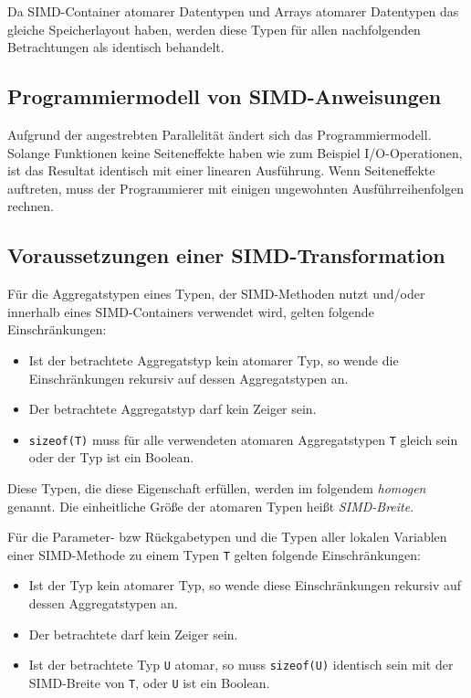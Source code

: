 \documentclass[a4paper,10pt]{article}
\begin{document}
Da SIMD-Container atomarer Datentypen und Arrays atomarer Datentypen das gleiche Speicherlayout
haben, werden diese Typen für allen nachfolgenden Betrachtungen als identisch behandelt.

\subsection{Programmiermodell von SIMD-Anweisungen}

Aufgrund der angestrebten Parallelität ändert sich das Programmiermodell. Solange Funktionen
keine Seiteneffekte haben wie zum Beispiel I/O-Operationen, ist das Resultat identisch mit
einer linearen Ausführung. Wenn Seiteneffekte auftreten, muss der Programmierer mit einigen
ungewohnten Ausführreihenfolgen rechnen. 

\subsection{Voraussetzungen einer SIMD-Transformation}

Für die Aggregatstypen eines Typen, der SIMD-Methoden nutzt und/oder innerhalb eines
SIMD-Containers verwendet wird, gelten folgende Einschränkungen:

\begin{itemize}

    \item Ist der betrachtete Aggregatstyp kein atomarer Typ, so wende die Einschränkungen rekursiv
    auf dessen Aggregatstypen an.

    \item Der betrachtete Aggregatstyp darf kein Zeiger sein.

    \item \texttt{sizeof(T)} muss für alle verwendeten atomaren Aggregatstypen \texttt{T} gleich
    sein oder der Typ ist ein Boolean. 

\end{itemize}

Diese Typen, die diese Eigenschaft erfüllen, werden im folgendem \emph{homogen} genannt. Die einheitliche
Größe der atomaren Typen heißt \emph{SIMD-Breite}.

Für die Parameter- bzw Rückgabetypen und die Typen aller lokalen Variablen einer SIMD-Methode zu
einem Typen \texttt{T} gelten folgende Einschränkungen:

\begin{itemize}

    \item Ist der Typ kein atomarer Typ, so wende diese Einschränkungen rekursiv auf dessen 
    Aggregatstypen an.

    \item Der betrachtete darf kein Zeiger sein.

    \item Ist der betrachtete Typ \texttt{U} atomar, so muss \texttt{sizeof(U)} identisch sein mit
    der SIMD-Breite von \texttt{T}, oder \texttt{U} ist ein Boolean.

\end{itemize}
\end{document}
